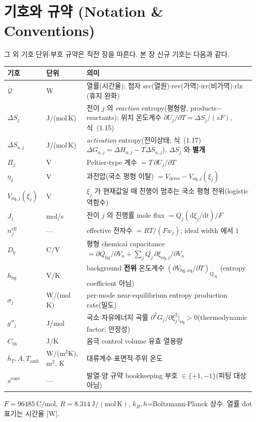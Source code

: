 \documentclass[11pt,a4paper]{article}
\newcommand{\dd}{\mathrm{d}}
\newcommand{\eff}{\mathrm{eff}}
\newcommand{\eq}{\mathrm{eq}}
\newcommand{\drive}{\mathrm{drive}}
\newcommand{\bg}{\mathrm{bg}}
\newcommand{\src}{\mathrm{src}}
\newcommand{\rev}{\mathrm{rev}}
\newcommand{\irr}{\mathrm{irr}}
\newcommand{\rlx}{\mathrm{rlx}}
\newcommand{\amb}{\mathrm{amb}}
\newcommand{\Th}{\mathrm{th}}
\newcommand{\conv}{\mathrm{conv}}
\begin{document}
\section{기호와 규약 (Notation \& Conventions)}\label{sec:ch2_notation}
그 외 기호$\cdot$단위$\cdot$부호 규약은 직전 장을 따른다. 본 장 신규 기호는 다음과 같다.
\begin{longtable}{p{} p{} p{}}
\toprule 기호 & 단위 & 의미 \\ \midrule \endhead
$\dot{\mathcal Q}$ & W & 열률(시간율); 첨자 $\src$(열원)$\cdot$$\rev$(가역)$\cdot$$\irr$(비가역)$\cdot$$\rlx$(휴지 완화) \\
$\Delta S_j$ & J/(mol\,K) & 전이 $j$ 의 \emph{reaction} entropy(평형량, products$-$reactants); 위치 온도계수 $\partial U_j/\partial T=\Delta S_j/(sF)$, 식~(1.15) \\
$\Delta S_{a,j}$ & J/(mol\,K) & \emph{activation} entropy(전이상태; 식~(1.17) $\Delta G_{a,j}=\Delta H_{a,j}-T\Delta S_{a,j}$). $\Delta S_j$ 와 \textbf{별개} \\
$\Pi_j$ & V & Peltier-type 계수 $=T\,\partial U_j/\partial T$ \\
$\eta_j$ & V & 과전압(국소 평형 이탈) $=V_\drive-V_{\eq,j}(\xi_j)$ \\
$V_{\eq,j}(\xi_j)$ & V & $\xi_j$ 가 현재값일 때 진행이 멈추는 국소 평형 전위(logistic 역함수) \\
$J_j$ & mol/s & 전이 $j$ 의 진행률 mole flux $=Q_j(\dd\xi_j/\dd t)/F$ \\
$n_j^{\eff}$ & --- & effective 전자수 $=RT/(Fw_j)$; ideal width 에서 $1$ \\
$D_q$ & C/V & 평형 chemical capacitance $=\partial Q_\bg/\partial V_n+\sum_j Q_j\,\partial\xi_{\eq,j}/\partial V_n$ \\
$h_\bg$ & V/K & background \textbf{전위} 온도계수 $(\partial V_{\bg,\eq}/\partial T)_{Q_\bg}$ (entropy coefficient 아님) \\
$\sigma_j$ & {\footnotesize W/(mol\,K)} & per-mode near-equilibrium entropy production rate(밀도) \\
$g''_j$ & J/mol & 국소 자유에너지 곡률 $\partial^2 G_j/\partial\xi_j^2|_\eq>0$(thermodynamic factor; 안정성) \\
$C_\Th$ & J/K & 음극 control volume 유효 열용량 \\
$h_T,A,T_\amb$ & {\footnotesize W/(m$^2$K), m$^2$, K} & 대류계수$\cdot$표면적$\cdot$주위 온도 \\
$s^{\conv}$ & --- & 발열-양 규약 bookkeeping 부호 $\in\{+1,-1\}$(피팅 대상 아님) \\
\bottomrule
\end{longtable}
$F=96485\ \mathrm{C/mol}$, $R=8.314\ \mathrm{J/(mol\,K)}$, $k_B,h$=Boltzmann$\cdot$Planck 상수. 열률 dot 표기는
시간율 [W].
\end{document}

